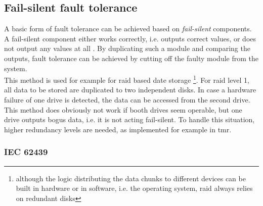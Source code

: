 \subsection{Fail-silent fault tolerance}
A basic form of fault tolerance can be achieved based on \textit{fail-silent} components. A fail-silent component
either works correctly, i.e. outputs correct values, or does not output any values at all \cite{544479}. By duplicating such a module and comparing the
outputs, fault tolerance can be achieved by cutting off the faulty module from the system.
\\
This method is used for example for \gls{raid} based date storage \footnote{although the logic distributing
the data chunks to different devices can be built in hardware or in software, i.e. the operating system, \gls{raid} always relies on redundant disks}.
For \gls{raid} level 1, all data to be stored are duplicated to two independent disks. In case a hardware failure of one drive is detected, the data can be accessed
from the second drive. This method does obviously not work if booth drives seem operable, but one drive outputs bogus data, i.e. it is not acting fail-silent.
To handle this situation, higher redundancy levels are needed, as implemented for example in \gls{tmr}. 

\subsubsection{IEC 62439}

